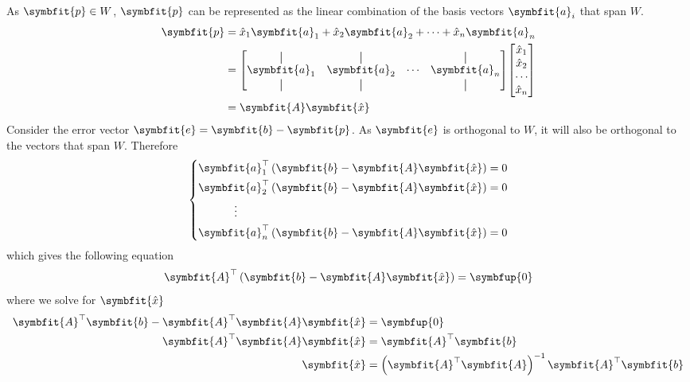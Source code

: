\documentclass{article}
\begin{document}
	\begin{solution}[Proof]
		As $\symbfit{p}\in W$, $\symbfit{p}$ can be represented as the linear combination of the basis vectors $\symbfit{a}_i$ that span $W$.
		\begin{align*}
			\symbfit{p} &= \hat{x}_1 \symbfit{a}_1 + \hat{x}_2 \symbfit{a}_2 + \dots + \hat{x}_n \symbfit{a}_n \\
			&= \mqty[
					\vertbar & \vertbar & & \vertbar \\ 
					\symbfit{a}_1 & \symbfit{a}_2 & \cdots & \symbfit{a}_n \\ 
					\vertbar & \vertbar & & \vertbar
				] 
				\mqty[
					\hat{x}_1 \\ 
					\hat{x}_2 \\ 
					\cdots \\ 
					\hat{x}_n
				] \\
			&= \symbfit{A}\symbfit{\hat{x}}
		\end{align*}
		Consider the error vector $\symbfit{e}=\symbfit{b}-\symbfit{p}$. As $\symbfit{e}$ is orthogonal to $W$, it will also be orthogonal to the vectors that span $W$. Therefore
		\begin{equation*}
			\left\{
				\begin{aligned}
					\symbfit{a}_1^\top\left( \symbfit{b}-\symbfit{A}\symbfit{\hat{x}} \right) &= 0 \\
					\symbfit{a}_2^\top\left( \symbfit{b}-\symbfit{A}\symbfit{\hat{x}} \right) &= 0 \\
					\vdotswithin{\symbfit{a}_3^\top}\phantom{\left( \symbfit{b}-\symbfit{A}\symbfit{\hat{x}} \right)} & \\
					\symbfit{a}_n^\top\left( \symbfit{b}-\symbfit{A}\symbfit{\hat{x}} \right) &= 0 
				\end{aligned}
			\right.
		\end{equation*}
		which gives the following equation
		\begin{equation*}
			\symbfit{A}^\top \left( \symbfit{b}-\symbfit{A}\symbfit{\hat{x}} \right) = \symbfup{0}
		\end{equation*}
		where we solve for $\symbfit{\hat{x}}$
		\begin{align*}
			\symbfit{A}^\top \symbfit{b}-\symbfit{A}^\top \symbfit{A}\symbfit{\hat{x}} &= \symbfup{0} \\
			\symbfit{A}^\top \symbfit{A}\symbfit{\hat{x}} &= \symbfit{A}^\top \symbfit{b} \\
			\symbfit{\hat{x}} &= \left( \symbfit{A}^\top \symbfit{A} \right)^{-1}\symbfit{A}^\top \symbfit{b}
		\end{align*}
	\end{solution}
\end{document}
